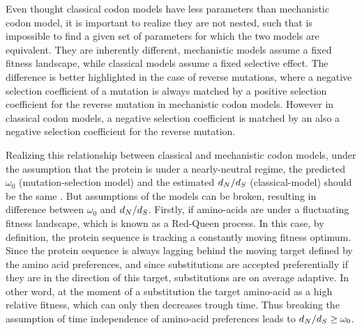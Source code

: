Even thought classical \gls{codon} models have less parameters than mechanistic \gls{codon} model, it is important to realize they are not nested, such that is impossible to find a given set of parameters for which the two models are equivalent.
They are inherently different, mechanistic models assume a fixed fitness landscape, while classical models assume a fixed selective effect.
The difference is better highlighted in the case of reverse mutations, where a negative selection coefficient of a mutation is always matched by a positive selection coefficient for the reverse mutation in mechanistic \gls{codon} models.
However in classical \gls{codon} models, a negative selection coefficient is matched by an also a negative selection coefficient for the reverse mutation.

Realizing this relationship between classical and mechanistic \gls{codon} models, under the assumption that the protein is under a \gls{nearly-neutral} regime, the predicted $\omega_0$ (mutation-selection model) and the estimated $d_N / d_S$ (classical-model) should be the same \citep{Spielman2015, Spielman2016}.
But assumptions of the models can be broken, resulting in difference between $\omega_0$ and $d_N / d_S$.
Firstly, if amino-acids are under a fluctuating fitness landscape, which is known as a Red-Queen process.
In this case, by definition, the protein sequence is tracking a constantly moving fitness optimum.
Since the protein sequence is always lagging behind the moving target defined by the amino acid preferences, and since \glspl{substitution} are accepted preferentially if they are in the direction of this target, \glspl{substitution} are on average adaptive.
In other word, at the moment of a \gls{substitution} the target amino-acid as a high relative fitness, which can only then decreases trough time.
Thus breaking the assumption of time independence of amino-acid preferences leads to $d_N / d_S \geq \omega_0$.

